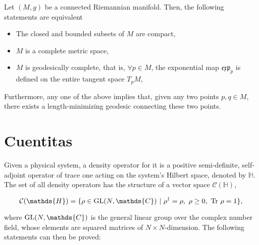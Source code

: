 \documentclass{homework}
\begin{document}
Let $(M,g)$ be a connected Riemannian manifold. Then, the following statements are equivalent

\begin{itemize}
    \item The closed and bounded subsets of $M$ are compact,
    \item $M$ is a complete metric space, 
    \item $M$ is geodesically complete, that is, $\forall p \in M$, the exponential map $\mathfrak{e}\mathfrak{x}\mathfrak{p}_{p}$ is defined on the entire tangent space $T_p M$,
\end{itemize}

Furthermore, any one of the above implies that, given any two points $p, q \in M$, there exists a length-minimizing geodesic connecting these two points. \\

\section{Cuentitas}

Given a physical system, a density operator for it is a positive semi-definite, self-adjoint operator of trace one acting on the system's Hilbert space, denoted by $\mathds{H}$. The set of all density operators has the structure of a vector space $\mathcal{C}(\mathds{H})$,

$$
\mathcal{C}(\mathds{H}) = \{ \rho \in \textnormal{GL}(N, \mathds{C}) \blanky | \blanky \rho^\dagger = \rho, \blanky \rho \geq 0, \blanky \textnormal{Tr } \rho = 1 \},
$$

where $\textnormal{GL}(N, \mathds{C})$ is the general linear group over the complex number field, whose elements are squared matrices of $N \times N$-dimension. The following statements can then be proved:
\end{document}

